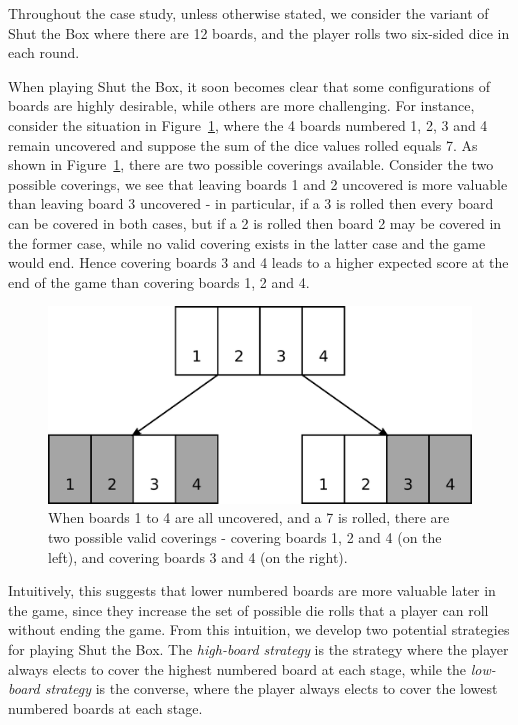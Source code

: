 Throughout the case study, unless otherwise stated, we consider the variant of Shut the Box where there are 12 boards, and the player rolls two six-sided dice in each round.

When playing Shut the Box, it soon becomes clear that some configurations of boards are highly desirable, while others are more challenging. For instance, consider the situation in Figure~\ref{cs1:cover_choice}, where the 4 boards numbered 1, 2, 3 and 4 remain uncovered and suppose the sum of the dice values rolled equals 7. As shown in Figure~\ref{cs1:cover_choice}, there are two possible coverings available. Consider the two possible coverings, we see that leaving boards 1 and 2 uncovered is more valuable than leaving board 3 uncovered - in particular, if a 3 is rolled then every board can be covered in both cases, but if a 2 is rolled then board 2 may be covered in the former case, while no valid covering exists in the latter case and the game would end. Hence covering boards 3 and 4 leads to a higher expected score at the end of the game than covering boards 1, 2 and 4.

\begin{figure}
    \centering
    \includegraphics[width=\textwidth]{images/cover_choice.pdf}
    \caption{When boards 1 to 4 are all uncovered, and a 7 is rolled, there are two possible valid coverings - covering boards 1, 2 and 4 (on the left), and covering boards 3 and 4 (on the right).}
    \label{cs1:cover_choice}
\end{figure}

Intuitively, this suggests that lower numbered boards are more valuable later in the game, since they increase the set of possible die rolls that a player can roll without ending the game. From this intuition, we develop two potential strategies for playing Shut the Box. The \emph{high-board strategy} is the strategy where the player always elects to cover the highest numbered board at each stage, while the \emph{low-board strategy} is the converse, where the player always elects to cover the lowest numbered boards at each stage.

